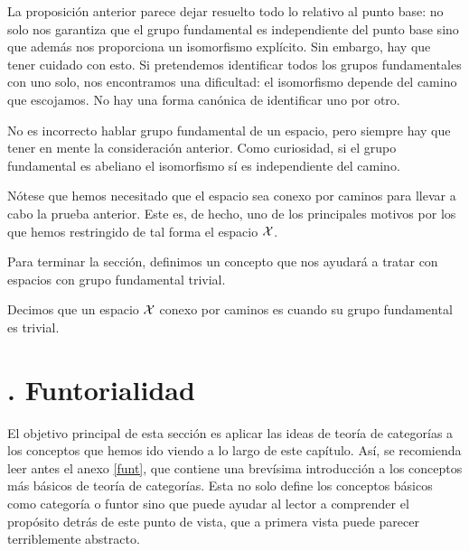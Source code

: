\begin{obs}
	La proposición anterior parece dejar resuelto todo lo relativo al punto base: no solo nos garantiza que el grupo fundamental es independiente del punto base sino que además nos proporciona un isomorfismo explícito. Sin embargo, hay que tener cuidado con esto. Si pretendemos identificar todos los grupos fundamentales con uno solo, nos encontramos una dificultad: el isomorfismo depende del camino que escojamos. No hay una forma canónica de identificar uno por otro. 
	
	No es incorrecto hablar  grupo fundamental de un espacio, pero siempre hay que tener en mente la consideración anterior. Como curiosidad, si el grupo fundamental es abeliano el isomorfismo sí es independiente del camino. 
\end{obs}

\begin{obs}
	Nótese que hemos necesitado que el espacio sea conexo por caminos para llevar a cabo la prueba anterior. Este es, de hecho, uno de los principales motivos por los que hemos restringido de tal forma el espacio $\mathcal{X}$.
\end{obs}

Para terminar la sección, definimos un concepto que nos ayudará a tratar con espacios con grupo fundamental trivial.

\begin{defi}
	Decimos que un espacio $\mathcal{X}$ conexo por caminos es  cuando su grupo fundamental es trivial.
\end{defi}

\section{. Funtorialidad}

El objetivo principal de esta sección es aplicar las ideas de teoría de categorías a los conceptos que hemos ido viendo a lo largo de este capítulo. Así, se recomienda leer antes el anexo \ref{funt}, que contiene una brevísima introducción a los conceptos más básicos de teoría de categorías. Esta no solo define los conceptos básicos como categoría o funtor sino que puede ayudar al lector a comprender el propósito detrás de este punto de vista, que a primera vista puede parecer terriblemente abstracto.

